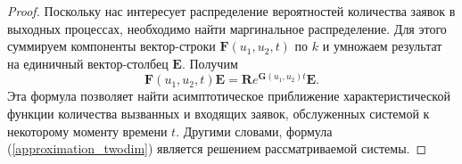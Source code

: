 \begin{proof}
	Поскольку нас интересует распределение вероятностей количества заявок в выходных процессах, необходимо найти маргинальное распределение. Для этого суммируем компоненты вектор-строки $\boldsymbol{F}(u_{1},u_{2},t)$ по $k$ и умножаем результат на единичный вектор-столбец $\boldsymbol{E}$. Получим
	\begin{equation}\label{approximation_twodim}
		\boldsymbol{F}(u_{1},u_{2},t)\boldsymbol{E}=\boldsymbol{R}e^{\boldsymbol{G}(u_{1},u_{2})t}\boldsymbol{E}.
	\end{equation}
	Эта формула позволяет найти асимптотическое приближение характеристической функции количества вызванных и входящих заявок, обслуженных системой к некоторому моменту времени $t$. Другими словами, формула (\ref{approximation_twodim}) является решением рассматриваемой системы. 
\end{proof}

